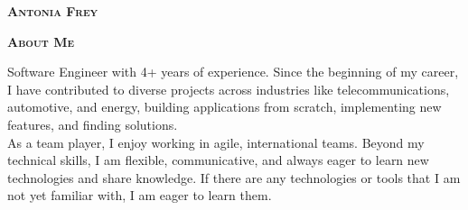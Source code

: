 \documentclass[10pt, a4paper]{article}
\newcommand{\headleft}[1]{%
    \vspace*{3ex}%
    \centering %
    {\large\textsc{\textbf{#1}}}\par %
    \vspace*{-1.5ex}%
    \hrulefill\par%
    \vspace*{0.8ex}%
}
\begin{document}
\setlength{\topskip}{0pt}
\setlength{\parindent}{0pt}
\setlength{\parskip}{0pt}
\setlength{\fboxsep}{0pt}
\pagestyle{empty}
\raggedbottom
{}

\begin{minipage}[t]{0.33\textwidth} 
\colorbox{cvblue}{\begin{minipage}[t][5mm][t]{\textwidth}\null\hfill\null\end{minipage}}

\vspace{-.2ex} 
\colorbox{cvblue!90}{\color{white}  
\textwidth\relax
\begin{minipage}[t][293mm][t]{0.82\textwidth}
\raggedright
\vspace*{2.5ex}


\noindent
\null\hfill%
%
\hfill\null

\vspace*{1ex}
{\centering 
\LARGE \textbf{\textsc{Antonia Frey}}\\
}
\vspace*{1ex}


\normalsize 

\headleft{About Me}
\parbox{1\textwidth}{
{\small
\justifying
\noindent Software Engineer with 4+ years of experience. Since the beginning of my career, I have contributed to diverse projects across industries like telecommunications, automotive, and energy, building applications from scratch, implementing new features, and finding solutions.\\
As a team player, I enjoy working in agile, international teams. Beyond my technical skills, I am flexible, communicative, and always eager to learn new technologies and share knowledge. If there are any technologies or tools that I am not yet familiar with, I am eager to learn them.
}}



\end{minipage}}
\end{minipage}
\end{document}
